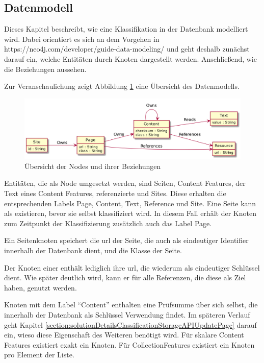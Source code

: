 \subsection{Datenmodell}
    \label{section:solutionDetailsPersistenceDataModel}
    Dieses Kapitel beschreibt, wie eine Klassifikation in der Datenbank modelliert wird.
    Dabei orientiert es sich an dem Vorgehen in https://neo4j.com/developer/guide-data-modeling/
    und geht deshalb zunächst darauf ein, welche Entitäten durch Knoten dargestellt werden.
    Anschließend, wie die Beziehungen aussehen.

    Zur Veranschaulichung zeigt Abbildung \ref{image:dbDataModelOverview} eine Übersicht des Datenmodells.

    \begin{figure}
        \centering
        \includegraphics[scale=\imageScalingFactor]{../resources/db-data-model/nodes.png}
        \caption{Übersicht der Nodes und ihrer Beziehungen}
        \label{image:dbDataModelOverview}
    \end{figure}

    Entitäten, die als Node umgesetzt werden, sind Seiten, Content Features,
    der Text eines Content Features, referenzierte {\resources} und Sites.
    Diese erhalten die entsprechenden Labels Page, Content, Text, Reference und Site.
    Eine Seite kann als {\resource} existieren, bevor sie selbst klassifiziert wird.
    In diesem Fall erhält der Knoten zum Zeitpunkt der Klassifizierung zusätzlich auch das Label Page.

    Ein Seitenknoten speichert die \gls{url} der Seite, die auch als eindeutiger Identifier innerhalb der Datenbank dient,
    und die Klasse der Seite.

    Der Knoten einer {\resource} enthält lediglich ihre \gls{url}, die wiederum als eindeutiger Schlüssel dient.
    Wie später deutlich wird, kann er für alle Referenzen, die diese {\resource} als Ziel haben, genutzt werden.

    Knoten mit dem Label "`Content"' enthalten eine Prüfsumme über sich selbst, die innerhalb der Datenbank als Schlüssel Verwendung findet.
    Im späteren Verlauf geht Kapitel \ref{section:solutionDetailsClassificationStorageAPIUpdatePage} darauf ein,
    wieso diese Eigenschaft des Weiteren benötigt wird.
    Für skalare Content Features existiert exakt ein Knoten.
    Für CollectionFeatures existiert ein Knoten pro Element der Liste.

